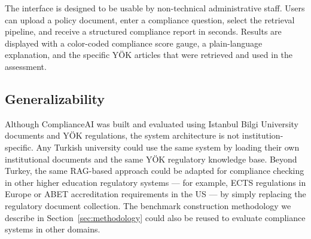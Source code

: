 The interface is designed to be usable by non-technical administrative staff.
Users can upload a policy document, enter a compliance question, select the
retrieval pipeline, and receive a structured compliance report in seconds.
Results are displayed with a color-coded compliance score gauge, a
plain-language explanation, and the specific YÖK articles that were
retrieved and used in the assessment.

\subsection{Generalizability}

Although ComplianceAI was built and evaluated using Istanbul Bilgi University
documents and YÖK regulations, the system architecture is not institution-specific.
Any Turkish university could use the same system by loading their own
institutional documents and the same YÖK regulatory knowledge base.
Beyond Turkey, the same RAG-based approach could be adapted for compliance
checking in other higher education regulatory systems --- for example,
ECTS regulations in Europe or ABET accreditation requirements in the US ---
by simply replacing the regulatory document collection.
The benchmark construction methodology we describe in Section~\ref{sec:methodology}
could also be reused to evaluate compliance systems in other domains.

